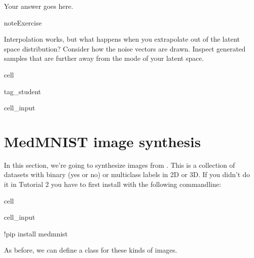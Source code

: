 \documentclass[letterpaper,10pt,english]{jupyterBook}
\begin{document}
\sphinxAtStartPar
Your answer goes here.

\begin{sphinxadmonition}{note}{Exercise}

\sphinxAtStartPar
Interpolation works, but what happens when you extrapolate out of the latent space distribution? Consider how the noise vectors are drawn. Inspect generated samples that are further away from the mode of your latent space.
\end{sphinxadmonition}

\begin{sphinxuseclass}{cell}
\begin{sphinxuseclass}{tag_student}\begin{sphinxVerbatimInput}

\begin{sphinxuseclass}{cell_input}
\begin{sphinxVerbatim}[commandchars=\\\{\}]
\end{sphinxVerbatim}

\end{sphinxuseclass}\end{sphinxVerbatimInput}

\end{sphinxuseclass}
\end{sphinxuseclass}

\chapter{MedMNIST image synthesis}
\label{\detokenize{notebooks/Tutorial4_Generative_Models/Tutorial4_Generative_Models_student:medmnist-image-synthesis}}
\sphinxAtStartPar
In this section, we’re going to synthesize images from . This is a collection of datasets with binary (yes or no) or multiclass labels in 2D or 3D. If you didn’t do it in Tutorial 2 you have to first install  with the following commandline:

\begin{sphinxuseclass}{cell}\begin{sphinxVerbatimInput}

\begin{sphinxuseclass}{cell_input}
\begin{sphinxVerbatim}[commandchars=\\\{\}]
!pip install medmnist
\end{sphinxVerbatim}

\end{sphinxuseclass}\end{sphinxVerbatimInput}

\end{sphinxuseclass}
\sphinxAtStartPar
As before, we can define a  class for these kinds of images.
\end{document}
